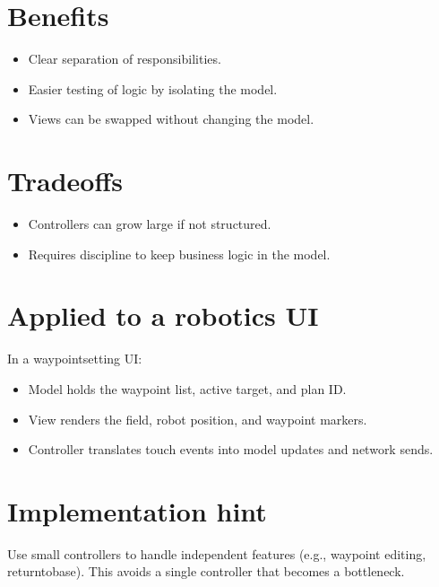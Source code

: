 \documentclass[letterpaper,10pt,english]{sphinxmanual}
\begin{document}
\section{Benefits}
\label{\detokenize{appendix_b_mvc_architecture:benefits}}\begin{itemize}
\item {} 
\sphinxAtStartPar
Clear separation of responsibilities.

\item {} 
\sphinxAtStartPar
Easier testing of logic by isolating the model.

\item {} 
\sphinxAtStartPar
Views can be swapped without changing the model.

\end{itemize}


\section{Tradeoffs}
\label{\detokenize{appendix_b_mvc_architecture:tradeoffs}}\begin{itemize}
\item {} 
\sphinxAtStartPar
Controllers can grow large if not structured.

\item {} 
\sphinxAtStartPar
Requires discipline to keep business logic in the model.

\end{itemize}


\section{Applied to a robotics UI}
\label{\detokenize{appendix_b_mvc_architecture:applied-to-a-robotics-ui}}
\sphinxAtStartPar
In a waypoint\sphinxhyphen{}setting UI:
\begin{itemize}
\item {} 
\sphinxAtStartPar
Model holds the waypoint list, active target, and plan ID.

\item {} 
\sphinxAtStartPar
View renders the field, robot position, and waypoint markers.

\item {} 
\sphinxAtStartPar
Controller translates touch events into model updates and network sends.

\end{itemize}


\section{Implementation hint}
\label{\detokenize{appendix_b_mvc_architecture:implementation-hint}}
\sphinxAtStartPar
Use small controllers to handle independent features (e.g., waypoint editing,
return\sphinxhyphen{}to\sphinxhyphen{}base). This avoids a single controller that becomes a bottleneck.
\end{document}

